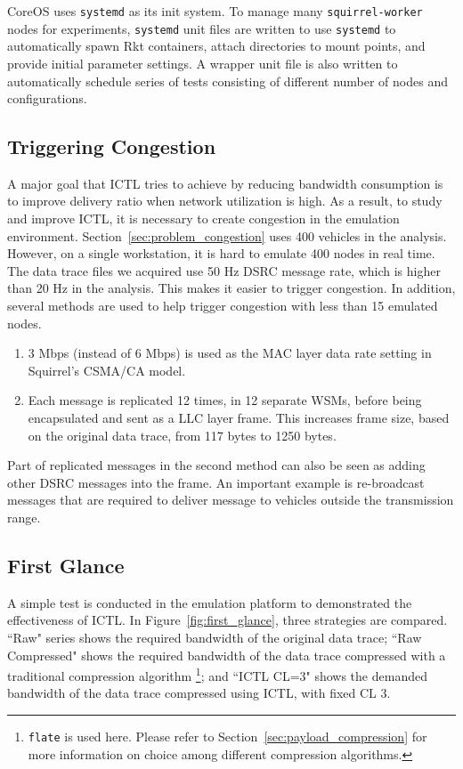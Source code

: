 \documentclass[12pt]{report}
\begin{document}
CoreOS uses \texttt{systemd} as its init system. To manage many \texttt{squirrel-worker} nodes for experiments, \texttt{systemd} unit files are written to use \texttt{systemd} to automatically spawn Rkt containers, attach directories to mount points, and provide initial parameter settings. A wrapper unit file is also written to automatically schedule series of tests consisting of different number of nodes and configurations.

\subsection{Triggering Congestion}
\label{sec:trigger_congestion}

A major goal that ICTL tries to achieve by reducing bandwidth consumption is to improve delivery ratio when network utilization is high. As a result, to study and improve ICTL, it is necessary to create congestion in the emulation environment. Section~\ref{sec:problem_congestion} uses 400 vehicles in the analysis. However, on a single workstation, it is hard to emulate 400 nodes in real time. The data trace files we acquired use 50 Hz DSRC message rate, which is higher than 20 Hz in the analysis. This makes it easier to trigger congestion. In addition, several methods are used to help trigger congestion with less than 15 emulated nodes.

\begin{enumerate}
  \item 3 Mbps (instead of 6 Mbps) is used as the MAC layer data rate setting in Squirrel's CSMA/CA model.
  \item Each message is replicated 12 times, in 12 separate WSMs, before being encapsulated and sent as a LLC layer frame. This increases frame size, based on the original data trace, from 117 bytes to 1250 bytes.
\end{enumerate}

Part of replicated messages in the second method can also be seen as adding other DSRC messages into the frame. An important example is re-broadcast messages that are required to deliver message to vehicles outside the transmission range.


\subsection{First Glance}

A simple test is conducted in the emulation platform to demonstrated the effectiveness of ICTL. In Figure~\ref{fig:first_glance}, three strategies are compared. ``Raw" series shows the required bandwidth of the original data trace; ``Raw Compressed" shows the required bandwidth of the data trace compressed with a traditional compression algorithm \footnote{\texttt{flate} is used here. Please refer to Section~\ref{sec:payload_compression} for more information on choice among different compression algorithms.}; and ``ICTL CL=3" shows the demanded bandwidth of the data trace compressed using ICTL, with fixed CL 3.
\end{document}
